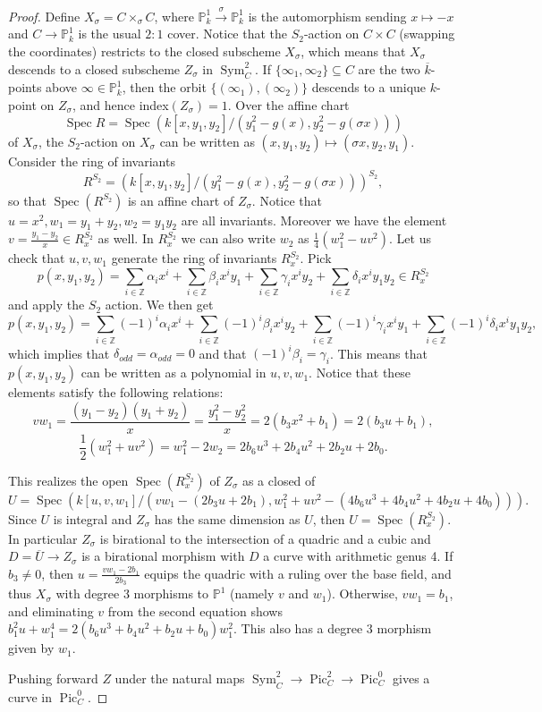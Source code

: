 \documentclass[10pt,a4paper]{amsart}
\DeclareMathOperator{\Spec}{Spec}
\DeclareMathOperator{\Sym}{Sym}
\newcommand{\Pic}{\operatorname{Pic}}
\begin{document}
\begin{proof}
    Define $X_\sigma = C \times_{\sigma} C$, where $\mathbb{P}^1_k \xrightarrow{\sigma} \mathbb{P}^1_k $ is the automorphism sending $x\mapsto -x$ and $C\to \mathbb{P}^1_k$ is the usual $2:1$ cover. 
    Notice that the $S_2$-action on $C\times C$ (swapping the coordinates) restricts to the closed subscheme $X_\sigma$, which means that $X_\sigma$ descends to a closed subscheme $Z_\sigma$ in $\Sym^2_C$. 
    If $\{\infty_1,\infty_2\}\subseteq C$ are the two $\overline{k}$-points above $\infty\in \mathbb{P}^1_k$, then the orbit $\{(\infty_1),(\infty_2)\}$ descends to a unique $k$-point on $Z_\sigma$, and hence index$(Z_\sigma)=1$.
    Over the affine chart
    \[
    \Spec R = \Spec \left( k[x ,y_1,y_2]/ (y_1^2- g( x ), y_2^2- g(\sigma x )) \right)
    \]
    of $X_\sigma$, the $S_2$-action on $X_\sigma$ can be written as $(x, y_1, y_2) \mapsto ( \sigma x, y_2, y_1)$. 
    Consider the ring of invariants
    \[
    R^{S_2} = \left( k[x ,y_1,y_2]/ (y_1^2- g( x ), y_2^2- g(\sigma x )) \right)^{S_2},
    \]
    so that $\Spec(R^{S_2})$ is an affine chart of $Z_\sigma$.
    Notice that $u=x^2, w_1= y_1+y_2,  w_2 = y_1y_2$ are all invariants.
    Moreover we have the element $v = \frac{y_1-y_2}{x}\in R_x^{S_2}$ as well.
   In $R_x^{S_2}$ we can also write $w_2$ as $\frac{1}{4}\left(w_1^2 - uv^2\right)$.
    Let us check that $u,v,w_1$ generate the ring of invariants $R_x^{S_2}$. 
    Pick 
    \[
    p(x,y_1,y_2) = \sum_{i\in \mathbb{Z}} \alpha_i x^i + \sum_{i\in \mathbb{Z}} \beta_i x^iy_1 +\sum_{i\in \mathbb{Z}} \gamma_i x^i y_2  + \sum_{i\in \mathbb{Z}} \delta_i x^i y_1y_2 \in R_x^{S_2}
    \]
    and apply the $S_2$ action.
    We then get
    \[
    p(x,y_1,y_2) = \sum_{i\in \mathbb{Z}} (-1)^i \alpha_i x^i + \sum_{i\in \mathbb{Z}} (-1)^i \beta_i x^iy_2 +\sum_{i\in \mathbb{Z}} (-1)^i \gamma_i x^i y_1  + \sum_{i\in \mathbb{Z}} (-1)^i \delta_i x^i y_1y_2,
    \]
    which implies that $\delta_{odd}=\alpha_{odd}=0$ and that $(-1)^i\beta_i=\gamma_i$.
    This means that $p(x,y_1,y_2)$ can be written as a polynomial in $u,v,w_1$.
    Notice that these elements satisfy the following relations:
    \[
    vw_1 = \frac{(y_1-y_2)(y_1+y_2)}{x} = \frac{y_1^2 - y_2^2}{x}  = 2(b_3x^2+b_1) = 2(b_3u+b_1),
    \]
    \[
    \frac{1}{2}(w_1^2+ uv^2) = w_1^2 - 2w_2 = 2b_6 u^3 + 2b_4 u^2 + 2b_2 u + 2b_0.
    \]
    
    This realizes the open $\Spec( R_x^{S_2} )$ of $Z_\sigma$ as a closed of 
    \[
        U = \Spec \left( k[u,v,w_1]/ (vw_1-(2b_3u+2b_1), w_1^2+uv^2 - (4b_6u^3 + 4b_4u^2 + 4b_2u + 4b_0)) \right).
    \]
    Since $U$ is integral and $Z_\sigma$ has the same dimension as $U$, then $U=\Spec( R_x^{S_2})$.
    In particular $Z_\sigma$ is birational to the intersection of a quadric and a cubic and  $D=\overline{U}\to Z_\sigma$ is a birational morphism with $D$ a curve with arithmetic genus 4.
    If $b_3 \neq 0$, then $u = \frac{vw_1 - 2b_1}{2b_3}$ equips the quadric with a ruling over the base field, and thus $X_\sigma$ with degree 3 morphisms to $\mathbb{P}^1$ (namely $v$ and $w_1$). Otherwise, $vw_1 = b_1$, and eliminating $v$ from the second equation shows $b_1^2 u + w_1^4 = 2(b_6 u^3 + b_4 u^2 + b_2 u + b_0)w_1^2$. This also has a degree 3 morphism given by $w_1$. 

    Pushing forward $Z$ under the natural maps $\Sym^2_C \to \Pic^2_C \to \Pic^0_C$ gives a curve in $\Pic^0_C$. 
\end{proof}
\end{document}
